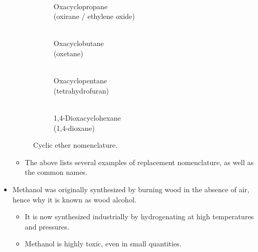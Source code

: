 \documentclass[../notes.tex]{subfiles}
\begin{document}
\begin{itemize}
\begin{figure}[H]
\begin{subfigure}[b]{0.24\linewidth}
            \centering
            \vspace{1em}
            \caption{\\Oxacyclopropane\\(oxirane / ethylene oxide)}
            \label{fig:cyclicEtherNomenclaturea}
        \end{subfigure}
        \begin{subfigure}[b]{0.24\linewidth}
            \centering
            \vspace{1em}
            \caption{\\Oxacyclobutane\\(oxetane)}
            \label{fig:cyclicEtherNomenclatureb}
        \end{subfigure}
        \begin{subfigure}[b]{0.24\linewidth}
            \centering
            \vspace{1em}
            \caption{\\Oxacyclopentane\\(tetrahydrofuran)}
            \label{fig:cyclicEtherNomenclaturec}
        \end{subfigure}
        \begin{subfigure}[b]{0.24\linewidth}
            \centering
            \vspace{1em}
            \caption{\\1,4-Dioxacyclohexane\\(1,4-dioxane)}
            \label{fig:cyclicEtherNomenclatured}
        \end{subfigure}
        \caption{Cyclic ether nomenclature.}
        \label{fig:cyclicEtherNomenclature}
    \end{figure}
    \begin{itemize}
        \item The above lists several examples of replacement nomenclature, as well as the common names.
    \end{itemize}
    \item Methanol was originally synthesized by burning wood in the absence of air, hence why it is known as wood alcohol.
    \begin{itemize}
        \item It is now synthesized industrially by hydrogenating  at high temperatures and pressures.
        \item Methanol is highly toxic, even in small quantities.

\end{itemize}
\end{itemize}
\end{document}
